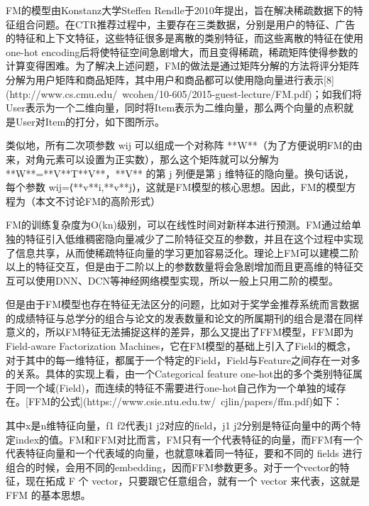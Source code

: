 FM的模型由Konstanz大学Steffen Rendle于2010年提出，旨在解决稀疏数据下的特征组合问题。在CTR推荐过程中，主要存在三类数据，分别是用户的特征、广告的特征和上下文特征，这些特征很多是离散的类别特征，而这些离散的特征在使用one-hot encoding后将使特征空间急剧增大，而且变得稀疏，稀疏矩阵使得参数的计算变得困难。为了解决上述问题，FM的做法是通过矩阵分解的方法将评分矩阵分解为用户矩阵和商品矩阵，其中用户和商品都可以使用隐向量进行表示[8](http://www.cs.cmu.edu/~wcohen/10-605/2015-guest-lecture/FM.pdf)；如我们将User表示为一个二维向量，同时将Item表示为二维向量，那么两个向量的点积就是User对Item的打分，如下图所示。





类似地，所有二次项参数 wij 可以组成一个对称阵 **W**（为了方便说明FM的由来，对角元素可以设置为正实数），那么这个矩阵就可以分解为 **W**=**V**T**V**，**V** 的第 j 列便是第 j 维特征的隐向量。换句话说，每个参数 wij=⟨**v**i,**v**j⟩，这就是FM模型的核心思想。因此，FM的模型方程为（本文不讨论FM的高阶形式）




FM的训练复杂度为O(kn)级别，可以在线性时间对新样本进行预测。FM通过给单独的特征引入低维稠密隐向量减少了二阶特征交互的参数，并且在这个过程中实现了信息共享，从而使稀疏特征向量的学习更加容易泛化。理论上FM可以建模二阶以上的特征交互，但是由于二阶以上的参数数量将会急剧增加而且更高维的特征交互可以使用DNN、DCN等神经网络模型实现，所以一般上只用二阶的模型。

但是由于FM模型也存在特征无法区分的问题，比如对于奖学金推荐系统而言数据的成绩特征与总学分的组合与论文的发表数量和论文的所属期刊的组合是潜在同样意义的，所以FM特征无法捕捉这样的差异，那么又提出了FFM模型，FFM即为Field-aware Factorization Machines，它在FM模型的基础上引入了Field的概念，对于其中的每一维特征，都属于一个特定的Field，Field与Feature之间存在一对多的关系。具体的实现上看，由一个Categorical feature one-hot出的多个类别特征属于同一个域(Field)，而连续的特征不需要进行one-hot自己作为一个单独的域存在。[FFM的公式](https://www.csie.ntu.edu.tw/~cjlin/papers/ffm.pdf)如下：





其中x是n维特征向量，f1 f2代表j1 j2对应的field，j1 j2分别是特征向量中的两个特定index的值。FM和FFM对比而言，FM只有一个代表特征的向量，而FFM有一个代表特征向量和一个代表域的向量，也就意味着同一特征，要和不同的 fields 进行组合的时候，会用不同的embedding，因而FFM参数更多。对于一个vector的特征，现在拓成 F 个 vector，只要跟它任意组合，就有一个 vector 来代表，这就是 FFM 的基本思想。

